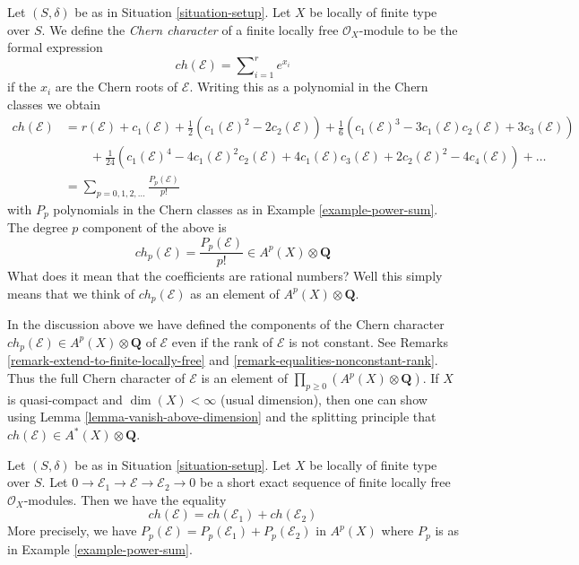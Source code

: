 \noindent
Let $(S, \delta)$ be as in Situation \ref{situation-setup}.
Let $X$ be locally of finite type over $S$.
We define the {\it Chern character} of a finite locally free
$\mathcal{O}_X$-module to be the formal expression
$$
ch({\mathcal E}) = \sum\nolimits_{i=1}^r e^{x_i}
$$
if the $x_i$ are the Chern roots of ${\mathcal E}$. Writing this
as a polynomial in the Chern classes we obtain
\begin{align*}
ch(\mathcal{E})
& =
r(\mathcal{E})
+
c_1(\mathcal{E}) +
\frac{1}{2}(c_1(\mathcal{E})^2 - 2c_2(\mathcal{E}))
+
\frac{1}{6}(c_1(\mathcal{E})^3 - 3c_1(\mathcal{E})c_2(\mathcal{E}) + 3c_3(\mathcal{E})) \\
& \quad\quad +
\frac{1}{24}(c_1(\mathcal{E})^4 - 4c_1(\mathcal{E})^2c_2(\mathcal{E}) + 4c_1(\mathcal{E})c_3(\mathcal{E}) + 2c_2(\mathcal{E})^2 - 4c_4(\mathcal{E}))
+
\ldots \\
& =
\sum\nolimits_{p = 0, 1, 2, \ldots} \frac{P_p(\mathcal{E})}{p!}
\end{align*}
with $P_p$ polynomials in the Chern classes as in
Example \ref{example-power-sum}. The degree $p$ component of
the above is
$$
ch_p(\mathcal{E}) = \frac{P_p(\mathcal{E})}{p!} \in A^p(X) \otimes \mathbf{Q}
$$
What does it mean that the coefficients are rational numbers?
Well this simply means that we think of
$ch_p(\mathcal{E})$ as an element of $A^p(X) \otimes \mathbf{Q}$.

\begin{remark}
\label{remark-extend-chern-character-to-finite-locally-free}
In the discussion above we have defined the components of the Chern character
$ch_p(\mathcal{E}) \in A^p(X) \otimes \mathbf{Q}$
of $\mathcal{E}$ even if the rank of $\mathcal{E}$
is not constant. See Remarks \ref{remark-extend-to-finite-locally-free} and
\ref{remark-equalities-nonconstant-rank}. Thus the full Chern character
of $\mathcal{E}$ is
an element of $\prod_{p \geq 0} (A^p(X) \otimes \mathbf{Q})$. If $X$
is quasi-compact and $\dim(X) < \infty$ (usual dimension), then one can show
using Lemma \ref{lemma-vanish-above-dimension} and the splitting principle
that $ch(\mathcal{E}) \in A^*(X) \otimes \mathbf{Q}$.
\end{remark}

\begin{lemma}
\label{lemma-chern-character-additive}
Let $(S, \delta)$ be as in Situation \ref{situation-setup}. Let $X$ be locally
of finite type over $S$. Let
$
0 \to \mathcal{E}_1 \to \mathcal{E} \to \mathcal{E}_2 \to 0
$
be a short exact sequence of finite locally free $\mathcal{O}_X$-modules.
Then we have the equality
$$
ch(\mathcal{E}) = ch(\mathcal{E}_1) + ch(\mathcal{E}_2)
$$
More precisely, we have
$P_p(\mathcal{E}) = P_p(\mathcal{E}_1) + P_p(\mathcal{E}_2)$
in $A^p(X)$ where $P_p$ is as in Example \ref{example-power-sum}.
\end{lemma}

